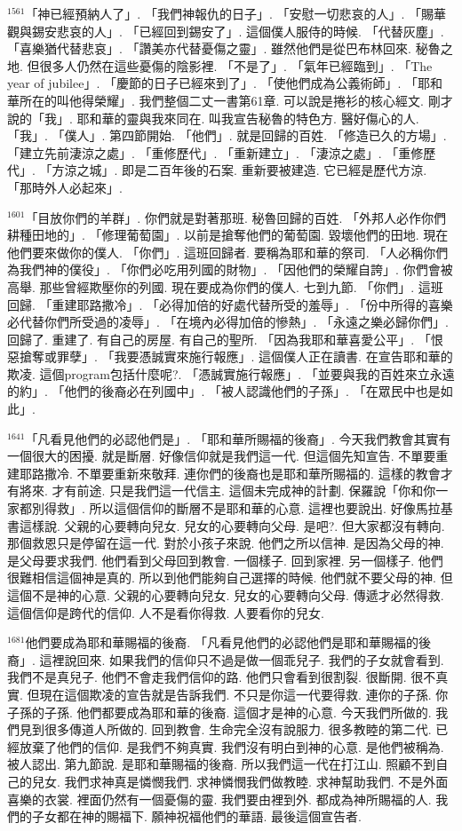 \documentclass{book}
\begin{document}
$^{1561}$「神已經預納人了」.
「我們神報仇的日子」.
「安慰一切悲哀的人」.
「賜華觀與錫安悲哀的人」.
「已經回到錫安了」.
這個僕人服侍的時候.
「代替灰塵」.
「喜樂猶代替悲哀」.
「讚美亦代替憂傷之靈」.
雖然他們是從巴布林回來.
秘魯之地.
但很多人仍然在這些憂傷的陰影裡.
「不是了」.
「氣年已經臨到」.
「The year of jubilee」.
「慶節的日子已經來到了」.
「使他們成為公義術師」.
「耶和華所在的叫他得榮耀」.
我們整個二丈一書第61章.
可以說是捲衫的核心經文.
剛才說的「我」.
耶和華的靈與我來同在.
叫我宣告秘魯的特色方.
醫好傷心的人.
「我」.
「僕人」.
第四節開始.
「他們」.
就是回歸的百姓.
「修造已久的方場」.
「建立先前淒涼之處」.
「重修歷代」.
「重新建立」.
「淒涼之處」.
「重修歷代」.
「方涼之城」.
即是二百年後的石案.
重新要被建造.
它已經是歷代方涼.
「那時外人必起來」.

$^{1601}$「目放你們的羊群」.
你們就是對著那班.
秘魯回歸的百姓.
「外邦人必作你們耕種田地的」.
「修理葡萄園」.
以前是搶奪他們的葡萄園.
毀壞他們的田地.
現在他們要來做你的僕人.
「你們」.
這班回歸者.
要稱為耶和華的祭司.
「人必稱你們為我們神的僕役」.
「你們必吃用列國的財物」.
「因他們的榮耀自誇」.
你們會被高舉.
那些曾經欺壓你的列國.
現在要成為你們的僕人.
七到九節.
「你們」.
這班回歸.
「重建耶路撒冷」.
「必得加倍的好處代替所受的羞辱」.
「份中所得的喜樂必代替你們所受過的凌辱」.
「在境內必得加倍的慘熱」.
「永遠之樂必歸你們」.
回歸了.
重建了.
有自己的房屋.
有自己的聖所.
「因為我耶和華喜愛公平」.
「恨惡搶奪或罪孽」.
「我要憑誠實來施行報應」.
這個僕人正在讀書.
在宣告耶和華的欺凌.
這個program包括什麼呢?.
「憑誠實施行報應」.
「並要與我的百姓來立永遠的約」.
「他們的後裔必在列國中」.
「被人認識他們的子孫」.
「在眾民中也是如此」.

$^{1641}$「凡看見他們的必認他們是」.
「耶和華所賜福的後裔」.
今天我們教會其實有一個很大的困擾.
就是斷層.
好像信仰就是我們這一代.
但這個先知宣告.
不單要重建耶路撒冷.
不單要重新來敬拜.
連你們的後裔也是耶和華所賜福的.
這樣的教會才有將來.
才有前途.
只是我們這一代信主.
這個未完成神的計劃.
保羅說「你和你一家都別得救」.
所以這個信仰的斷層不是耶和華的心意.
這裡也要說出.
好像馬拉基書這樣說.
父親的心要轉向兒女.
兒女的心要轉向父母.
是吧?.
但大家都沒有轉向.
那個救恩只是停留在這一代.
對於小孩子來說.
他們之所以信神.
是因為父母的神.
是父母要求我們.
他們看到父母回到教會.
一個樣子.
回到家裡.
另一個樣子.
他們很難相信這個神是真的.
所以到他們能夠自己選擇的時候.
他們就不要父母的神.
但這個不是神的心意.
父親的心要轉向兒女.
兒女的心要轉向父母.
傳遞才必然得救.
這個信仰是跨代的信仰.
人不是看你得救.
人要看你的兒女.

$^{1681}$他們要成為耶和華賜福的後裔.
「凡看見他們的必認他們是耶和華賜福的後裔」.
這裡說回來.
如果我們的信仰只不過是做一個乖兒子.
我們的子女就會看到.
我們不是真兒子.
他們不會走我們信仰的路.
他們只會看到很割裂.
很斷開.
很不真實.
但現在這個欺凌的宣告就是告訴我們.
不只是你這一代要得救.
連你的子孫.
你子孫的子孫.
他們都要成為耶和華的後裔.
這個才是神的心意.
今天我們所做的.
我們見到很多傳道人所做的.
回到教會.
生命完全沒有說服力.
很多教睦的第二代.
已經放棄了他們的信仰.
是我們不夠真實.
我們沒有明白到神的心意.
是他們被稱為.
被人認出.
第九節說.
是耶和華賜福的後裔.
所以我們這一代在打江山.
照顧不到自己的兒女.
我們求神真是憐憫我們.
求神憐憫我們做教睦.
求神幫助我們.
不是外面喜樂的衣裳.
裡面仍然有一個憂傷的靈.
我們要由裡到外.
都成為神所賜福的人.
我們的子女都在神的賜福下.
願神祝福他們的華語.
最後這個宣告者.
\end{document}

